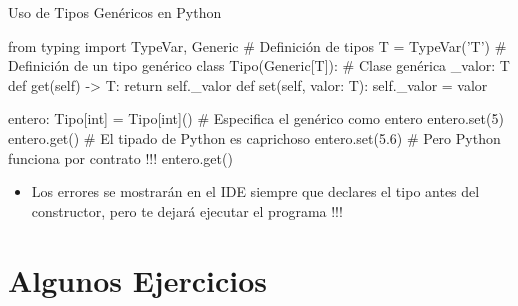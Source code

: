 \documentclass[10pt, envcountsect , spanish]{beamer}
\begin{document}
\begin{frame}[fragile]{Uso de  Tipos Genéricos en Python} 
\small
\begin{pyconsole}[][frame=single, fontsize=\scriptsize]
from typing import TypeVar, Generic # Definición de tipos
T = TypeVar('T')          # Definición de un tipo genérico
class Tipo(Generic[T]):  # Clase genérica
    _valor: T
    def get(self) -> T:
        return self._valor
    def set(self, valor: T):
        self._valor = valor

entero: Tipo[int] = Tipo[int]()  # Especifica el genérico como entero
entero.set(5)
entero.get()
# El tipado de Python es caprichoso
entero.set(5.6)   # Pero Python funciona por contrato !!!
entero.get()
\end{pyconsole}

\begin{itemize}
\item Los errores se mostrarán en el IDE siempre que declares el tipo antes del constructor, pero te dejará ejecutar el programa !!!
\end{itemize}
\end{frame}






\section{Algunos Ejercicios}
\end{document}
